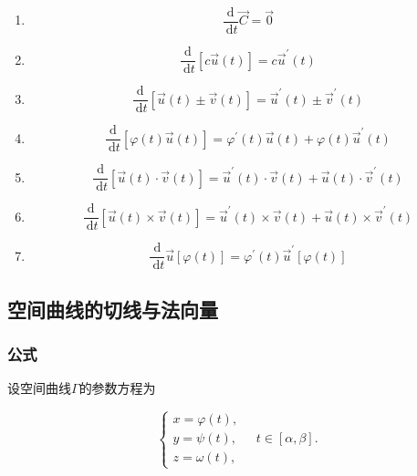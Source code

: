 \documentclass[12pt, a4paper]{article}
\numberwithin{equation}{section}
\begin{document}
    \begin{enumerate}
        \item $$
                \frac{\mathrm{d}}{\mathrm{~d} t} \overrightarrow{C}=\overrightarrow{0}
            $$
        \item $$
                \frac{\mathrm{d}}{\mathrm{~d} t}[c \overrightarrow{u}(t)]=c \overrightarrow{u}^{\prime}(t)
            $$
        \item $$
                \frac{\mathrm{d}}{\mathrm{~d} t}[\overrightarrow{u}(t) \pm \overrightarrow{v}(t)]=\overrightarrow{u}^{\prime}(t) \pm \overrightarrow{v}^{\prime}(t)
            $$
        \item $$
                \frac{\mathrm{d}}{\mathrm{~d} t}[\varphi(t) \overrightarrow{u}(t)]=
                \varphi^{\prime}(t) \overrightarrow{u}(t)+\varphi(t) \overrightarrow{u}^{\prime}(t)
            $$
        \item $$
                \frac{\mathrm{d}}{\mathrm{~d} t}[\overrightarrow{u}(t) \cdot \overrightarrow{v}(t)]=
                \overrightarrow{u}^{\prime}(t) \cdot \overrightarrow{v}(t)+\overrightarrow{u}(t) \cdot \overrightarrow{v}^{\prime}(t)
            $$
        \item $$
                \frac{\mathrm{d}}{\mathrm{~d} t}[\overrightarrow{u}(t) \times \overrightarrow{v}(t)]=
                \overrightarrow{u}^{\prime}(t) \times \overrightarrow{v}(t)+\overrightarrow{u}(t) \times \overrightarrow{v}^{\prime}(t)
            $$
        \item $$
                \frac{\mathrm{d}}{\mathrm{~d} t} \overrightarrow{u}[\varphi(t)]=\varphi^{\prime}(t) \overrightarrow{u}^{\prime}[\varphi(t)]
            $$
    \end{enumerate}

\subsection{空间曲线的切线与法向量}

\subsubsection{公式}

    设空间曲线\(\varGamma\)的参数方程为

    \begin{equation}
        \left\{\begin{array}{l}
            x=\varphi(t), \\
            y=\psi(t), \\
            z=\omega(t),
        \end{array} \quad t \in[\alpha, \beta]. \right.
        \label{9-6-7}
    \end{equation}
\end{document}
